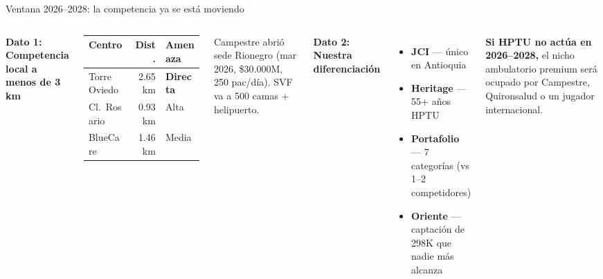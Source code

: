 \documentclass[aspectratio=169, 12pt]{beamer}
\begin{document}
{
\begin{frame}{Ventana 2026--2028: la competencia ya se está moviendo}

\begin{columns}[T]
\vspace{-2pt}

{\footnotesize\textbf{Dato 1: Competencia local a menos de 3 km}}

\vspace{3pt}
{\scriptsize
\begin{tabular}{@{}lrl@{}}
\toprule
\textbf{Centro} & \textbf{Dist.} & \textbf{Amenaza} \\
\midrule
\rowcolor{brecha!8}
Torre Oviedo & 2.65 km & \textcolor{brecha}{\textbf{Directa}} \\
Cl.\ Rosario & 0.93 km & Alta \\
\rowcolor{brecha!6}
BlueCare & 1.46 km & Media \\
\bottomrule
\end{tabular}

\vspace{3pt}
Campestre abrió sede Rionegro (mar 2026, \$30.000M, 250 pac/día). SVF va a 500 camas + helipuerto.
}

\vspace{-2pt}

{\footnotesize\textbf{Dato 2: Nuestra diferenciación}}

\vspace{4pt}
{\scriptsize
\begin{itemize}\setlength{\itemsep}{2pt}
  \item \textcolor{marca}{\textbf{JCI}} — único en Antioquia
  \item \textcolor{marca}{\textbf{Heritage}} — 55+ años HPTU
  \item \textcolor{mercado}{\textbf{Portafolio}} — 7 categorías (vs 1--2 competidores)
  \item \textcolor{velocidad}{\textbf{Oriente}} — captación de 298K que nadie más alcanza
\end{itemize}

\vspace{4pt}
\textcolor{rose}{\textbf{Si HPTU no actúa en 2026--2028,}} el nicho ambulatorio premium será ocupado por Campestre, Quironsalud o un jugador internacional.
}
\end{columns}
\end{frame}
}
\end{document}
